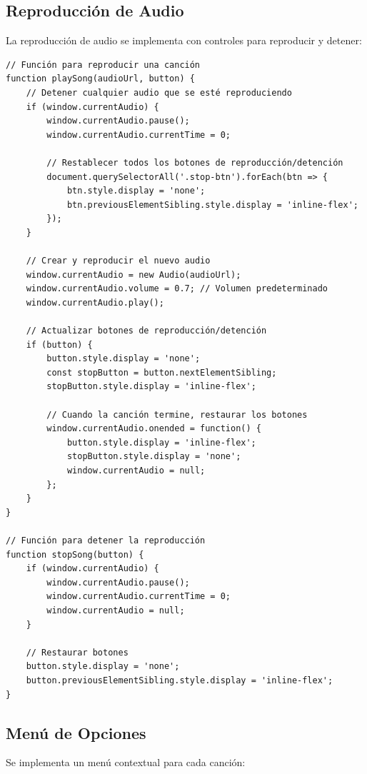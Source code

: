 \documentclass[a4paper,12pt]{article}
\begin{document}
\subsection{Reproducción de Audio}
La reproducción de audio se implementa con controles para reproducir y detener:

\begin{verbatim}
// Función para reproducir una canción
function playSong(audioUrl, button) {
    // Detener cualquier audio que se esté reproduciendo
    if (window.currentAudio) {
        window.currentAudio.pause();
        window.currentAudio.currentTime = 0;
        
        // Restablecer todos los botones de reproducción/detención
        document.querySelectorAll('.stop-btn').forEach(btn => {
            btn.style.display = 'none';
            btn.previousElementSibling.style.display = 'inline-flex';
        });
    }
    
    // Crear y reproducir el nuevo audio
    window.currentAudio = new Audio(audioUrl);
    window.currentAudio.volume = 0.7; // Volumen predeterminado
    window.currentAudio.play();
    
    // Actualizar botones de reproducción/detención
    if (button) {
        button.style.display = 'none';
        const stopButton = button.nextElementSibling;
        stopButton.style.display = 'inline-flex';
        
        // Cuando la canción termine, restaurar los botones
        window.currentAudio.onended = function() {
            button.style.display = 'inline-flex';
            stopButton.style.display = 'none';
            window.currentAudio = null;
        };
    }
}

// Función para detener la reproducción
function stopSong(button) {
    if (window.currentAudio) {
        window.currentAudio.pause();
        window.currentAudio.currentTime = 0;
        window.currentAudio = null;
    }
    
    // Restaurar botones
    button.style.display = 'none';
    button.previousElementSibling.style.display = 'inline-flex';
}
\end{verbatim}

\subsection{Menú de Opciones}
Se implementa un menú contextual para cada canción:
\end{document}
